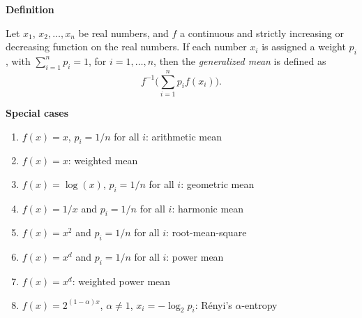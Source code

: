 \documentclass[12pt]{article}
\begin{document}
{\bf Definition}

Let $x_1$, $x_2,\ldots, x_n$ be real numbers, and $f$ a continuous
and strictly increasing or decreasing function on the real
numbers. If each number $x_i$ is assigned a weight $p_i$, with
$\sum_{i=1}^n p_i= 1$, for $i=1,\ldots,n$, then the \emph{generalized mean}
is defined as
\[
  f^{-1}\Big( \sum_{i=1}^n p_i f(x_i) \Big).
\]

{\bf Special cases}

\begin{enumerate}
\item $f(x)=x$, $p_i=1/n$ for all $i$: arithmetic mean

\item $f(x)=x$: weighted mean

\item $f(x)=\log(x)$, $p_i=1/n$ for all $i$: geometric mean

\item $f(x)=1/x$ and $p_i=1/n$ for all $i$: harmonic mean

\item $f(x)=x^2$ and $p_i=1/n$ for all $i$: root-mean-square

\item $f(x)=x^d$ and $p_i=1/n$ for all $i$: power mean

\item $f(x)=x^d$: weighted power mean

\item $f(x)=2^{(1-\alpha)x}$, $\alpha\neq 1$, $x_i=-\log_2 p_i$:
R\'enyi's $\alpha$-entropy
\end{enumerate}
\end{document}
